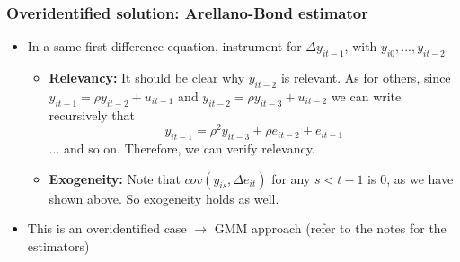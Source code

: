 \documentclass[aspectratio=169]{beamer}
\begin{document}
\begin{frame}
\frametitle{Overidentified solution: Arellano-Bond estimator}
\begin{itemize}
\item In a same first-difference equation, instrument for $\Delta y_{it-1}$, with $y_{i0},...,y_{it-2}$
\begin{itemize}
\item \textbf{Relevancy:} It should be clear why $y_{it-2}$ is relevant. As for others, since $y_{it-1}=\rho y_{it-2}+u_{it-1}$ and $y_{it-2}=\rho y_{it-3}+u_{it-2}$ we can write recursively that
\[
y_{it-1} = \rho^2 y_{it-3}+\rho e_{it-2} + e_{it-1}
\]
... and so on. Therefore, we can verify relevancy.
\item \textbf{Exogeneity:} Note that $cov(y_{is},\Delta e_{it})$ for any $s<t-1$ is 0, as we have shown above. So exogeneity holds as well.

\end{itemize}
\item  This is an overidentified case $\to$ GMM approach (refer to the notes for the estimators)
 \end{itemize} 
\end{frame}
\end{document}
